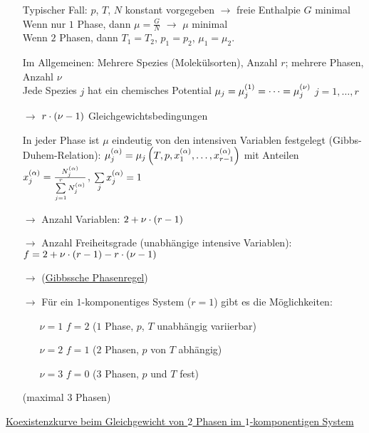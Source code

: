 \begin{itemize}[align=left]
  \item[Typischer Fall:] $p$, $T$, $N$ konstant vorgegeben $\rightarrow$ freie Enthalpie $G$ minimal\\
  Wenn nur $1$ Phase, dann $\mu = \frac{G}{N}$ $\rightarrow$ $\mu$ minimal\\
  Wenn $2$ Phasen, dann $T_1= T_2$, $p_1 = p_2$, $\mu_1 = \mu_2$.
  \item[Im Allgemeinen:] Mehrere Spezies (Molekülsorten), Anzahl $r$; mehrere Phasen, Anzahl $\nu$\\ Jede Spezies $j$ hat ein chemisches Potential $\mu_j = \mu_j^{\left( 1 \right)} = \dots = \mu_j^{\left( \nu \right)}$ $j = 1, \dots, r$
  \item[$\rightarrow$] $r\cdot\left( \nu-1 \right)$ Gleichgewichtsbedingungen
  \item[In jeder Phase] ist $\mu$ eindeutig von den intensiven Variablen festgelegt (Gibbs-Duhem-Relation): $\mu_j^{\left( \alpha \right)} = \mu_j\left( T,p,x_1^{\left( \alpha \right)}, \dots, x_{r-1}^{\left( \alpha \right)} \right)$ mit Anteilen $x_j^{\left( \alpha \right)} = \frac{N_j^{\left( \alpha \right)}}{\sum\limits_{j=1}^r N_j^{\left( \alpha \right)}}$, $\sum\limits_j x_j^{\left( \alpha \right)} = 1$
  \item[$\rightarrow$ Anzahl Variablen:] $2 + \nu\cdot\left( r-1 \right)$
  \item[$\rightarrow$ Anzahl Freiheitsgrade (unabhängige intensive Variablen):] $f = 2 + \nu\cdot\left( r-1 \right) - r\cdot\left( \nu-1 \right)$
  \item[$\rightarrow$]  (\uline{Gibbssche Phasenregel})
  \item[$\rightarrow$] Für ein $1$-komponentiges System ($r=1$) gibt es die Möglichkeiten: \begin{itemize}[align=left]
    \item[$\nu=1$] $f=2$ ($1$ Phase, $p$, $T$ unabhängig variierbar)
    \item[$\nu = 2$] $f=1$ ($2$ Phasen, $p$ von $T$ abhängig)
    \item[$\nu=3$] $f=0$ ($3$ Phasen, $p$ und $T$ fest)
  \end{itemize}
  (maximal 3 Phasen)
\end{itemize}
\uline{Koexistenzkurve beim Gleichgewicht von $2$ Phasen im $1$-komponentigen System}

\begin{figure}[H]
  \centering
  
\end{figure}

